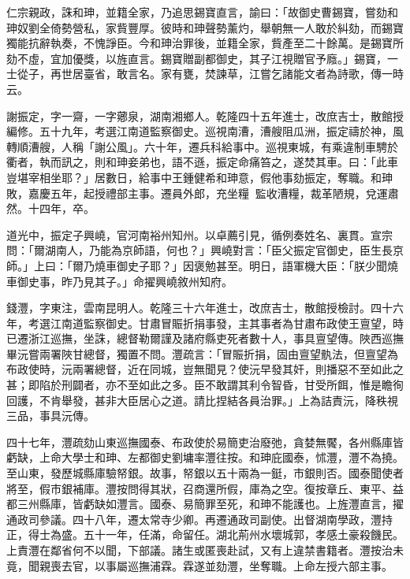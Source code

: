 \begin{pinyinscope}
仁宗親政，誅和珅，並籍全家，乃追思錫寶直言，諭曰：「故御史曹錫寶，嘗劾和珅奴劉全倚勢營私，家貲豐厚。彼時和珅聲勢薰灼，舉朝無一人敢於糾劾，而錫寶獨能抗辭執奏，不愧諍臣。今和珅治罪後，並籍全家，貲產至二十餘萬。是錫寶所劾不虛，宜加優獎，以旌直言。錫寶贈副都御史，其子江視贈官予廕。」錫寶，一士從子，再世居臺省，敢言名。家有甕，焚諫草，江嘗乞諸能文者為詩歌，傳一時云。

謝振定，字一齋，一字薌泉，湖南湘鄉人。乾隆四十五年進士，改庶吉士，散館授編修。五十九年，考選江南道監察御史。巡視南漕，漕艘阻瓜洲，振定禱於神，風轉順漕艘，人稱「謝公風」。六十年，遷兵科給事中。巡視東城，有乘違制車騁於衢者，執而訊之，則和珅妾弟也，語不遜，振定命痛笞之，遂焚其車。曰：「此車豈堪宰相坐耶？」居數日，給事中王鍾健希和珅意，假他事劾振定，奪職。和珅敗，嘉慶五年，起授禮部主事。遷員外郎，充坐糧，監收漕糧，裁革陋規，兌運肅然。十四年，卒。

道光中，振定子興嶢，官河南裕州知州。以卓薦引見，循例奏姓名、裏貫。宣宗問：「爾湖南人，乃能為京師語，何也？」興嶢對言：「臣父振定官御史，臣生長京師。」上曰：「爾乃燒車御史子耶？」因褒勉甚至。明日，語軍機大臣：「朕少聞燒車御史事，昨乃見其子。」命擢興嶢敘州知府。

錢灃，字東注，雲南昆明人。乾隆三十六年進士，改庶吉士，散館授檢討。四十六年，考選江南道監察御史。甘肅冒賑折捐事發，主其事者為甘肅布政使王亶望，時已遷浙江巡撫，坐誅，總督勒爾謹及諸府縣吏死者數十人，事具亶望傳。陜西巡撫畢沅嘗兩署陜甘總督，獨置不問。灃疏言：「冒賑折捐，固由亶望骫法，但亶望為布政使時，沅兩署總督，近在同城，豈無聞見？使沅早發其奸，則播惡不至如此之甚；即陷於刑闢者，亦不至如此之多。臣不敢謂其利令智昏，甘受所餌，惟是瞻徇回護，不肯舉發，甚非大臣居心之道。請比捏結各員治罪。」上為詰責沅，降秩視三品，事具沅傳。

四十七年，灃疏劾山東巡撫國泰、布政使於易簡吏治廢弛，貪婪無饜，各州縣庫皆虧缺，上命大學士和珅、左都御史劉墉率灃往按。和珅庇國泰，怵灃，灃不為撓。至山東，發歷城縣庫驗帑銀。故事，帑銀以五十兩為一鋌，市銀則否。國泰聞使者將至，假市銀補庫。灃按問得其狀，召商還所假，庫為之空。復按章丘、東平、益都三州縣庫，皆虧缺如灃言。國泰、易簡罪至死，和珅不能護也。上旌灃直言，擢通政司參議。四十八年，遷太常寺少卿。再遷通政司副使。出督湖南學政，灃持正，得士為盛。五十一年，任滿，命留任。湖北荊州水壞城郭，孝感土豪殺饑民。上責灃在鄰省何不以聞，下部議。諸生或匿喪赴試，又有上違禁書籍者。灃按治未竟，聞親喪去官，以事屬巡撫浦霖。霖遂並劾灃，坐奪職。上命左授六部主事。


\end{pinyinscope}
